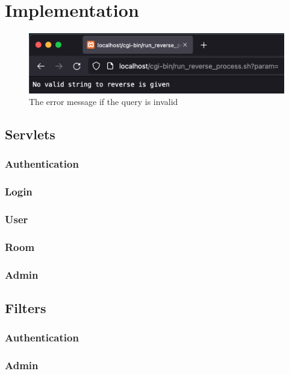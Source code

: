 \section{Implementation}\label{sec:03_impl}

\begin{figure}[h]
\centering
\includegraphics[scale=0.6]{images/part2Failure2}
\caption{The error message if the query is invalid}
\label{fig:02_part2_impl_failure2}
\end{figure}

\subsection{Servlets}\label{subsec:03_impl_servlets}

\subsubsection{Authentication}\label{subsubsec:03_impl_servlets_auth}

\subsubsection{Login}\label{subsubsec:03_impl_servlets_login}

\subsubsection{User}\label{subsubsec:03_impl_servlets_user}

\subsubsection{Room}\label{subsubsec:03_impl_servlets_room}

\subsubsection{Admin}\label{subsubsec:03_impl_servlets_admin}


\subsection{Filters}\label{subsec:03_impl_filters}

\subsubsection{Authentication}\label{subsubsec:03_impl_filters_auth}

\subsubsection{Admin}\label{subsubsec:03_impl_filters_admin}
